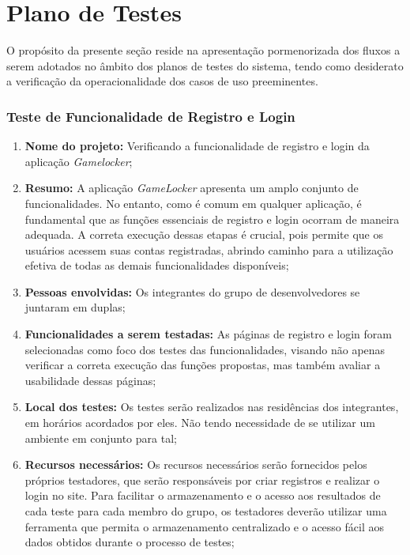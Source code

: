 \section{Plano de Testes}

O propósito da presente seção reside na apresentação pormenorizada dos fluxos a serem adotados no âmbito dos planos de testes do sistema, tendo como desiderato a verificação da operacionalidade dos casos de uso preeminentes.

\subsubsection{Teste de Funcionalidade de Registro e Login}
\begin{enumerate}

\item{\textbf{Nome do projeto:}}
Verificando a funcionalidade de registro e login da aplicação \textit{Gamelocker};

\item{\textbf{Resumo:}}
A aplicação \textit{GameLocker} apresenta um amplo conjunto de funcionalidades. No entanto, como é comum em qualquer aplicação, é fundamental que as funções essenciais de registro e login ocorram de maneira adequada. A correta execução dessas etapas é crucial, pois permite que os usuários acessem suas contas registradas, abrindo caminho para a utilização efetiva de todas as demais funcionalidades disponíveis;

\item{\textbf{Pessoas envolvidas:}}
Os integrantes do grupo de desenvolvedores se juntaram em duplas;

\item{\textbf{Funcionalidades a serem testadas:}}
As páginas de registro e login foram selecionadas como foco dos testes das funcionalidades, visando não apenas verificar a correta execução das funções propostas, mas também avaliar a usabilidade dessas páginas;

\item{\textbf{Local dos testes:}}
Os testes serão realizados nas residências dos integrantes, em horários acordados por eles. Não tendo necessidade de se utilizar um ambiente em conjunto para tal;

\item{\textbf{Recursos necessários:}}
Os recursos necessários serão fornecidos pelos próprios testadores, que serão responsáveis por criar registros e realizar o login no site. Para facilitar o armazenamento e o acesso aos resultados de cada teste para cada membro do grupo, os testadores deverão utilizar uma ferramenta que permita o armazenamento centralizado e o acesso fácil aos dados obtidos durante o processo de testes;


\end{enumerate}
